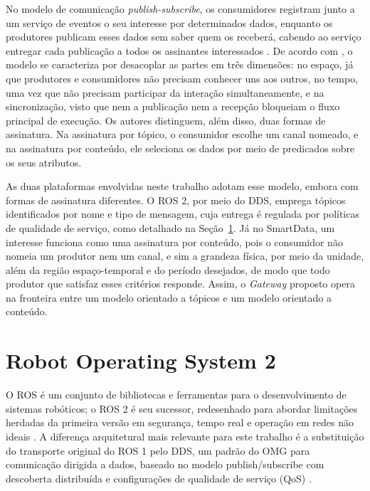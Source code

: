 \documentclass[
    12pt,
    oneside,
    a4paper,
    chapter=TITLE,
    section=TITLE,
    english,
    brazil
]{abntex2}
\begin{document}
No modelo de comunicação \textit{publish-subscribe}, os consumidores
registram junto a um serviço de eventos o seu interesse por determinados
dados, enquanto os produtores publicam esses dados sem saber quem os
receberá, cabendo ao serviço entregar cada publicação a todos os
assinantes interessados \cite{eugster2003pubsub}. De acordo com
, o modelo se caracteriza por desacoplar as
partes em três dimensões: no espaço, já que produtores e consumidores não
precisam conhecer uns aos outros, no tempo, uma vez que não precisam
participar da interação simultaneamente, e na sincronização, visto que
nem a publicação nem a recepção bloqueiam o fluxo principal de execução.
Os autores distinguem, além disso, duas formas de assinatura. Na
assinatura por tópico, o consumidor escolhe um canal nomeado, e
na assinatura por conteúdo, ele seleciona os dados por meio de
predicados sobre os seus atributos.

As duas plataformas envolvidas neste trabalho adotam esse modelo, embora
com formas de assinatura diferentes. O ROS 2, por meio do DDS, emprega
tópicos identificados por nome e tipo de mensagem, cuja entrega é regulada por políticas de
qualidade de serviço, como detalhado na Seção~\ref{sec:ros2}. Já no
SmartData, um interesse funciona como uma assinatura por
conteúdo, pois o consumidor não nomeia um produtor nem um canal, e sim a
grandeza física, por meio da unidade, além da região espaço-temporal e do
período desejados, de modo que todo produtor que satisfaz esses critérios
responde. Assim, o \textit{Gateway} proposto opera na fronteira entre um
modelo orientado a tópicos e um modelo orientado a conteúdo.

\section{Robot Operating System 2}
\label{sec:ros2}

O ROS é um conjunto de bibliotecas e ferramentas para o desenvolvimento de
sistemas robóticos; o ROS 2 é seu sucessor, redesenhado para abordar
limitações herdadas da primeira versão em segurança, tempo real e
operação em redes não ideais \cite{macenski2022ros2}. A diferença
arquitetural mais relevante para este trabalho é a substituição do
transporte original do ROS 1 pelo DDS, um padrão do OMG para comunicação dirigida a dados, baseado no modelo
publish/subscribe com descoberta distribuída e configurações de qualidade
de serviço (QoS) \cite{maruyama2016ros2}.
\end{document}
